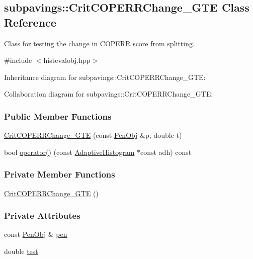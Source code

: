 \hypertarget{classsubpavings_1_1CritCOPERRChange__GTE}{\subsection{subpavings\-:\-:\-Crit\-C\-O\-P\-E\-R\-R\-Change\-\_\-\-G\-T\-E \-Class \-Reference}
\label{classsubpavings_1_1CritCOPERRChange__GTE}
}


\-Class for testing the change in \-C\-O\-P\-E\-R\-R score from splitting.  




{\ttfamily \#include $<$histevalobj.\-hpp$>$}



\-Inheritance diagram for subpavings\-:\-:\-Crit\-C\-O\-P\-E\-R\-R\-Change\-\_\-\-G\-T\-E\-:


\-Collaboration diagram for subpavings\-:\-:\-Crit\-C\-O\-P\-E\-R\-R\-Change\-\_\-\-G\-T\-E\-:
\subsubsection*{\-Public \-Member \-Functions}
\begin{DoxyCompactItemize}
\item 
\hyperlink{classsubpavings_1_1CritCOPERRChange__GTE_a2f80e08de2ccaa3f5f1de19aef7fee08}{\-Crit\-C\-O\-P\-E\-R\-R\-Change\-\_\-\-G\-T\-E} (const \hyperlink{classsubpavings_1_1PenObj}{\-Pen\-Obj} \&p, double t)
\item 
bool \hyperlink{classsubpavings_1_1CritCOPERRChange__GTE_ad08dfb82007a802cd298e97e7264bbe9}{operator()} (const \hyperlink{classsubpavings_1_1AdaptiveHistogram}{\-Adaptive\-Histogram} $\ast$const adh) const 
\end{DoxyCompactItemize}
\subsubsection*{\-Private \-Member \-Functions}
\begin{DoxyCompactItemize}
\item 
\hyperlink{classsubpavings_1_1CritCOPERRChange__GTE_aa9af364ca5ff7d5dbcb41025f39d82fe}{\-Crit\-C\-O\-P\-E\-R\-R\-Change\-\_\-\-G\-T\-E} ()
\end{DoxyCompactItemize}
\subsubsection*{\-Private \-Attributes}
\begin{DoxyCompactItemize}
\item 
const \hyperlink{classsubpavings_1_1PenObj}{\-Pen\-Obj} \& \hyperlink{classsubpavings_1_1CritCOPERRChange__GTE_a271ec32d40ebe1dae73df5e346b05864}{pen}
\item 
double \hyperlink{classsubpavings_1_1CritCOPERRChange__GTE_a917da285fdf7ad2e6132f3ec9446dcd0}{test}
\end{DoxyCompactItemize}



